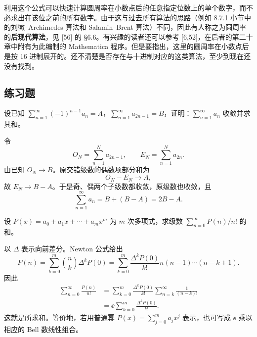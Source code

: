 \begin{xremark}
利用这个公式可以快速计算圆周率在小数点后的任意指定位数上的单个数字，而不必求出在该位之前的所有数字。由于这与过去所有算法的思路（例如 8.7.1 小节中的刘徽--Archimedes 算法和 Salamin--Brent 算法）不同，因此有人称之为圆周率的\textbf{后现代算法}，见 [56] 的 §6.6。有兴趣的读者还可以参考 [6,52]，在后者的第二十章中附有为此编制的 Mathematica 程序。但是要指出，这里的圆周率在小数点后是按 16 进制展开的。还不清楚是否存在与十进制对应的这类算法，至少到现在还没有找到。
\end{xremark}

\subsection{练习题}

\begin{xexercise}[1]
设已知 $\sum_{n=1}^{\infty}(-1)^{n-1}a_n=A$，$\sum_{n=1}^{\infty}a_{2n-1}=B$，证明：$\sum_{n=1}^{\infty}a_n$ 收敛并求其和。
\end{xexercise}
\begin{xsolution}
令
\[
  O_N=\sum_{n=1}^Na_{2n-1},\qquad E_N=\sum_{n=1}^Na_{2n}.
\]
由已知 $O_N\to B$。原交错级数的偶数项部分和为
\[
  O_N-E_N\to A,
\]
故 $E_N\to B-A$。于是奇、偶两个子级数都收敛，原级数也收敛，且
\[
  \sum_{n=1}^{\infty}a_n=B+(B-A)=2B-A.
\]
\end{xsolution}


\begin{xexercise}[2]
设 $P(x)=a_0+a_1x+\cdots+a_mx^m$ 为 $m$ 次多项式，求级数 $\sum_{n=0}^{\infty}P(n)/n!$ 的和。
\end{xexercise}
\begin{xsolution}
以 $\Delta$ 表示向前差分。Newton 公式给出
\[
  P(n)=\sum_{k=0}^m\binom nk\Delta^kP(0)
  =\sum_{k=0}^m\frac{\Delta^kP(0)}{k!}
    n(n-1)\cdots(n-k+1).
\]
因此
\[
\begin{aligned}
  \sum_{n=0}^{\infty}\frac{P(n)}{n!}
  &=\sum_{k=0}^m\frac{\Delta^kP(0)}{k!}
    \sum_{n=k}^{\infty}\frac1{(n-k)!}\\
  &=\ee\sum_{k=0}^m\frac{\Delta^kP(0)}{k!}.
\end{aligned}
\]
这就是所求和。等价地，若用普通幂 $P(x)=\sum_{j=0}^ma_jx^j$ 表示，也可写成 $\ee$ 乘以相应的 Bell 数线性组合。
\end{xsolution}


